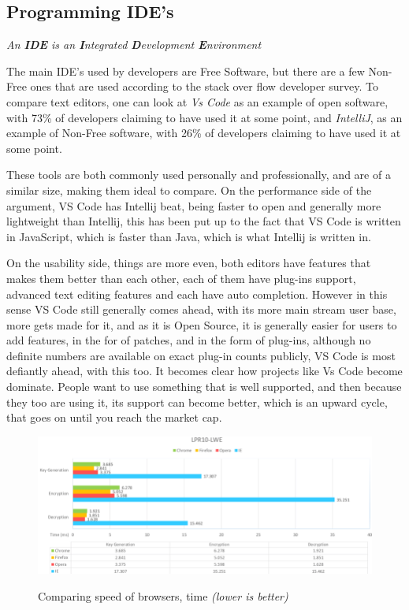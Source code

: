 \documentclass[a4paper,12pt]{article}
\begin{document}
{\subsection{Programming IDE's} \textit{An \textbf{IDE} is an \textbf{I}ntegrated \textbf{D}evelopment
\textbf{E}nvironment}

The main IDE's used by developers are Free Software, but there are a few Non-Free ones that are used according to
the stack over flow developer survey\cite{IDEusage}.  To compare text editors, one can look at \textit{Vs Code} as
an example of open software, with 73\% of developers claiming to have used it at some point, and \textit{IntelliJ},
as an example of Non-Free software, with 26\% of developers claiming to have used it at some point\cite{IDEusage}.

These tools are both commonly used personally and professionally, and are of a similar size, making them ideal to
compare. On the performance side of the argument, VS Code has Intellij beat, being faster to open and generally
more lightweight than Intellij, this has been put up to the fact that VS Code is written in JavaScript, which is
faster than Java, which is what Intellij is written in\cite{VSCODEvsintellij}.

On the usability side, things are more even, both editors have features that makes them better than each other,
each of them have plug-ins support, advanced text editing features and each have auto completion. However in this
sense VS Code still generally comes ahead, with its more main stream user base, more gets made for it, and as it is
Open Source, it is generally easier for users to add features, in the for of patches, and in the form of plug-ins,
although no definite numbers are available on exact plug-in counts publicly, VS Code is most defiantly ahead,
with this too.	It becomes clear how projects like Vs Code become dominate. People want to use something that is
well supported, and then because they too are using it, its support can become better, which is an upward cycle,
that goes on until you reach the market cap.

\begin{figure}[h]
	\caption{Comparing speed of browsers, time \textit{(lower is better)}}
	\includegraphics[width=\textwidth]{webbrowserperfomace.png}  \label{fig:graph}
\end{figure}

}
\end{document}
